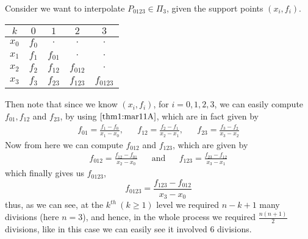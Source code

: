 \begin{example}\label{eg1:mar11A}
    Consider we want to interpolate $P_{0123} \in \Pi_3$, given the support points $(x_i,f_i)$.

    \begin{center}
        \begin{tabular}{c|cccc}
            $k$ & $0$ & $1$ & $2$ & $3$ \\
            \hline 
            $ x_0 $ & $f_0$ & $ \cdot $ & $ \cdot $ & $ \cdot $ \\
            $ x_1 $ & $f_1$ & $f_{01}$ & $ \cdot $ & $ \cdot $ \\
            $ x_2 $ & $f_2$ & $f_{12}$ & $f_{012}$ & $ \cdot $ \\
            $ x_3 $ & $f_3$ & $f_{23}$ & $f_{123}$ & $f_{0123}$ 
        \end{tabular}
    \end{center}

    Then note that since we know $(x_i,f_i)$, for $i=0,1,2,3$, we can easily compute $f_{01}, f_{12}$ and $f_{23}$, by using  $\ref{thm1:mar11A}$, which are in fact given by 
    \begin{align*}
        f_{01} = \frac{f_1 - f_0}{x_1 - x_0}, &&f_{12} = \frac{f_2 - f_1}{x_2 - x_1}, &&f_{23} = \frac{f_3 - f_2}{x_3 - x_2}
    \end{align*}
    Now from here we can compute $f_{012}$ and $f_{123}$, which are given by 
    \begin{align*}
        f_{012} = \frac{f_{12} - f_{01}}{x_2 - x_0} &&\mbox{and} &&f_{123} = \frac{f_{23} - f_{12}}{x_3 - x_1}
    \end{align*}
    which finally gives us $f_{0123}$, 
    \[
        f_{0123} = \frac{f_{123} - f_{012}}{x_3 - x_0}    
    \]
    thus, as we can see, at the $k^{th} \ (k \geq 1)$ level we required $n - k + 1$ many divisions (here $n=3$), and hence, in the whole process we required $\frac{n(n+1)}{2}$ divisions, like in this case we can easily see it involved $6$ divisions.
\end{example}